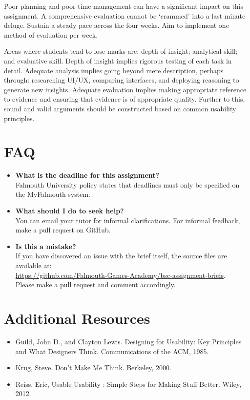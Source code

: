 \documentclass{../fal_assignment}
\begin{document}
Poor planning and poor time management can have a significant impact on this assignment. A comprehensive evaluation cannot be `crammed' into a last minute deluge. Sustain a steady pace across the four weeks. Aim to implement one method of evaluation per week.

Areas where students tend to lose marks are: depth of insight; analytical skill; and evaluative skill. Depth of insight implies rigorous testing of each task in detail. Adequate analysis implies going beyond mere description, perhaps through: researching UI/UX, comparing interfaces, and deploying reasoning to generate new insights. Adequate evaluation implies making appropriate reference to evidence and ensuring that evidence is of appropriate quality. Further to this, sound and valid arguments should be constructed based on common usability principles. 

\section*{FAQ}

\begin{itemize}
	\item 	\textbf{What is the deadline for this assignment?} \\ 
    		Falmouth University policy states that deadlines must only be specified on the MyFalmouth system.
    		
	\item 	\textbf{What should I do to seek help?} \\ 
    		You can email your tutor for informal clarifications. For informal feedback, make a pull request on GitHub. 
    		
    	\item 	\textbf{Is this a mistake?} \\ 	
    		If you have discovered an issue with the brief itself, the source files are available at: \\
    		\url{https://github.com/Falmouth-Games-Academy/bsc-assignment-briefs}.\\
    		 Please make a pull request and comment accordingly.
\end{itemize}

\section*{Additional Resources}
\begin{itemize}
    \item Guild, John D., and Clayton Lewis. Designing for Usability: Key Principles and What Designers Think. Communications of the ACM, 1985.
    \item Krug, Steve. Don't Make Me Think. Berkeley, 2000. 
    \item Reiss, Eric, Usable Usability : Simple Steps for Making Stuff Better. Wiley, 2012.
\end{itemize}
\end{document}
